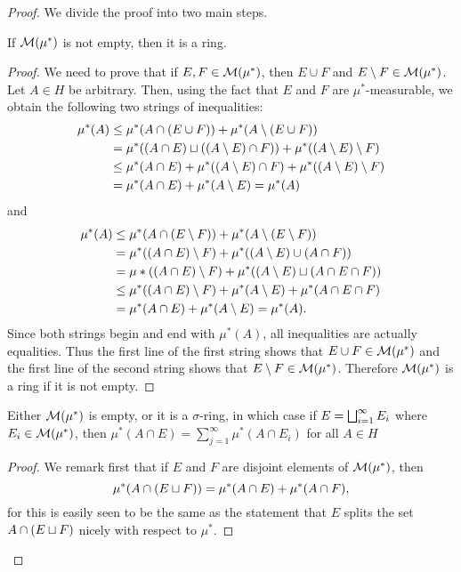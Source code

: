 \begin{proof}

We divide the proof into two main steps.

\begin{lemma}
If ${\cal M}(\mu^*)$ is not empty, then it is a ring.
\end{lemma}
\begin{proof}
We need to prove that if $E,F \in {\cal M}(\mu^*)$, then $E \cup F$ and $E\setminus F\in {\cal M}(\mu^*)$. Let ${A} \in {H}$ be arbitrary. Then, using the fact that $E$ and ${F}$ are $\mu^*$-measurable, we obtain the following two strings of inequalities:
\begin{align*}
    \mu^*(A)&\leq\mu^*(A \cap(E \cup F))+\mu^*(A\setminus(E \cup F)) \\
    &=\mu^*((A \cap E) \sqcup((A\setminus E) \cap F))+\mu^*((A\setminus E)\setminus F) \\
    & \leq \mu^*(A \cap E)+\mu^*((A\setminus E) \cap F)+\mu^*((A\setminus E)\setminus F) \\
    &=\mu^*(A \cap E)+\mu^*(A\setminus E)=\mu^*(A)
\end{align*}
and
\begin{align*}
\mu^*(A) & \leq \mu^*(A \cap(E\setminus F))+\mu^*(A\setminus (E\setminus F)) \\
&=\mu^*((A \cap E)\setminus F)+\mu^*((A\setminus E) \cup(A \cap F)) \\
&=\mu *((A \cap E)\setminus F)+\mu^*((A\setminus E) \sqcup(A \cap E\cap F)) \\
& \leq \mu^*((A \cap E)\setminus F)+\mu^*(A\setminus E)+\mu^*(A \cap E\cap F) \\
&=\mu^*(A \cap E)+\mu^*(A\setminus E)=\mu^*(A) .
\end{align*}
Since both strings begin and end with $\mu^*(A)$, all inequalities are actually equalities. Thus the first line of the first string shows that $E \cup F\in {\cal M}(\mu^*)$ and the first line of the second string shows that $E\setminus F\in {\cal M}(\mu^*)$. Therefore ${\cal M}(\mu^*)$ is a ring if it is not empty.
\end{proof}

\begin{lemma}\label{lem:outer measure sigma additivity}
Either ${\cal M}(\mu^*)$ is empty, or it is a $\sigma$-ring, in which case if $E=\bigsqcup_{i=1}^\infty E_i$ where $E_i\in{\cal M}(\mu^*)$, then $\mu^*(A \cap E)=\sum_{j=1}^\infty \mu^*(A \cap E_i)$ for all ${A} \in {H}$
\end{lemma}
\begin{proof}
We remark first that if $E$ and $F$ are disjoint elements of ${\cal M}(\mu^*)$, then \[\mu^*(A \cap(E \sqcup F))=\mu^*(A \cap E)+\mu^*(A \cap F),\] for this is easily seen to be the same as the statement that $E$ splits the set $A \cap(E \sqcup F)$ nicely with respect to $\mu^*$.


\end{proof}
\end{proof}
